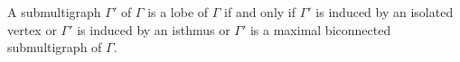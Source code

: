 A submultigraph $\Gamma'$ of $\Gamma$ is a lobe of $\Gamma$ if and only if $\Gamma'$ is induced by an isolated vertex or $\Gamma'$ is induced by an isthmus or $\Gamma'$ is a maximal biconnected submultigraph of $\Gamma$.